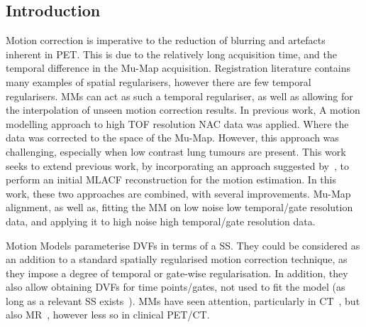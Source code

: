         \subsection{Introduction} \label{sec:pet_ct_motion_correction_exploiting_motion_models_fit_on_coarsely_gated_data_applied_to_finely_gated_data_introduction}
            Motion correction is imperative to the reduction of blurring and artefacts inherent in \gls{PET}. This is due to the relatively long acquisition time, and the temporal difference in the \gls{Mu-Map} acquisition. Registration literature contains many examples of spatial regularisers, however there are few temporal regularisers. \glspl{MM} can act as such a temporal regulariser, as well as allowing for the interpolation of unseen motion correction results. In previous work, A motion modelling approach to high \gls{TOF} resolution \gls{NAC} data was applied. Where the data was corrected to the space of the \gls{Mu-Map}. However, this approach was challenging, especially when low contrast lung tumours are present. This work seeks to extend previous work, by incorporating an approach suggested by~\parencite{Lu2018RespiratoryData}, to perform an initial \gls{MLACF} reconstruction for the motion estimation. In this work, these two approaches are combined, with several improvements. \gls{Mu-Map} alignment, as well as, fitting the \gls{MM} on low noise low temporal/gate resolution data, and applying it to high noise high temporal/gate resolution data.%
            
            Motion Models parameterise \glspl{DVF} in terms of a \gls{SS}. They could be considered as an addition to a standard spatially regularised motion correction technique, as they impose a degree of temporal or gate-wise regularisation. In addition, they also allow obtaining \glspl{DVF} for time points/gates, not used to fit the model (as long as a relevant \gls{SS} exists~\parencite{McClelland2013}). \glspl{MM} have seen attention, particularly in \gls{CT}~\parencite{Li2007EnhancedModel}, but also \gls{MR}~\parencite{Manke2002RespiratoryModels, Manber2016JointCorrection}, however less so in clinical \gls{PET}/\gls{CT}.
            
